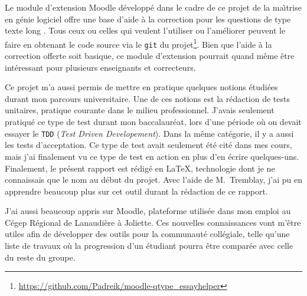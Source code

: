 \begin{conclusion}
Le module d'extension Moodle d\'evelopp\'e dans le cadre de ce projet de la ma\^\i trise en g\'enie logiciel offre une base d'aide \`a la correction pour les questions de type \og texte long \fg{}.
Tous ceux ou celles qui veulent l'utiliser ou l'am\'eliorer peuvent le faire en obtenant le code source via le \texttt{git} du projet\footnote{\url{https://github.com/Padreik/moodle-qtype_essayhelper}}.
Bien que l'aide \`a la correction offerte soit basique, ce module d'extension pourrait quand m\^eme \^etre int\'eressant pour plusieurs enseignants et correcteurs.

Ce projet m'a aussi permis de mettre en pratique quelques notions \'etudi\'ees durant mon parcours universitaire.
Une de ces notions est la r\'edaction de tests unitaires, pratique courante dans le milieu professionnel.
J'avais seulement pratiqu\'e ce type de test durant mon baccalaur\'eat, lors d'une p\'eriode o\`u on devait essayer le \texttt{TDD} (\textit{Test Driven Developement}).
Dans la m\^eme cat\'egorie, il y a aussi les tests d'acceptation.
Ce type de test avait seulement \'et\'e cit\'e dans mes cours, mais j'ai finalement vu ce type de test en action en plus d'en \'ecrire quelques-uns.
Finalement, le pr\'esent rapport est r\'edig\'e en \LaTeX, technologie dont je ne connaissais que le nom au d\'ebut du projet.
Avec l'aide de M.\ Tremblay, j'ai pu en apprendre beaucoup plus sur cet outil durant la r\'edaction de ce rapport.

J'ai aussi beaucoup appris sur Moodle, plateforme utilis\'ee dans mon emploi au C\'egep R\'egional de Lanaudi\`ere \`a Joliette.
Ces nouvelles connaissances vont m'\^etre utiles afin de d\'evelopper des outils pour la communaut\'e coll\'egiale, telle qu'une liste de travaux o\`u la progression d'un \'etudiant pourra \^etre compar\'ee avec celle du reste du groupe.


\end{conclusion}
